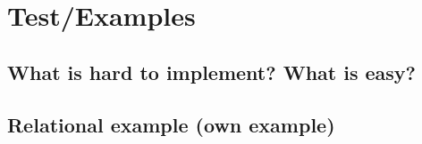 
\section{Test/Examples}


\subsection{What is hard to implement? What is easy?}


\subsection{Relational example (own example)}

